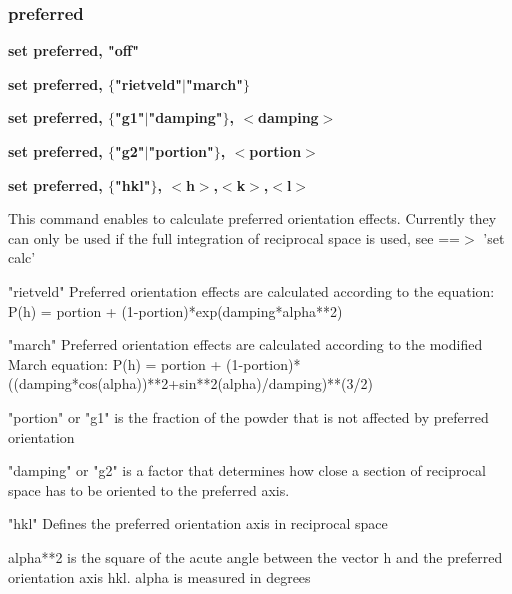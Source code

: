 \subsubsection{preferred}
{\bf set preferred, "off" \par }
{\bf set preferred, $ \{$"rietveld"$| $"march"$\} $ \par }
{\bf set preferred, $ \{$"g1"$| $"damping"$\} $, $ <$damping$> $ \par }
{\bf set preferred, $ \{$"g2"$| $"portion"$\} $, $ <$portion$> $ \par }
{\bf set preferred, $ \{$"hkl"$\} $, $ <$h$> $,$ <$k$> $,$ <$l$> $ \par }
\par
\vspace{3pt}
This command enables to calculate preferred orientation effects. 
Currently they can only be used if the full integration of reciprocal 
space is used, see ==$> $ 'set calc' 
\par
"rietveld" 
Preferred orientation effects are calculated according to the equation: 
P(h) = portion + (1-portion)*exp(damping*alpha**2) 
\par
"march" 
Preferred orientation effects are calculated according to the 
modified March equation: 
P(h) = portion + (1-portion)*((damping*cos(alpha))**2+sin**2(alpha)/damping)**(3/2) 
\par
"portion" or "g1" 
is the fraction of the powder that is not affected by preferred 
          orientation 
\par
"damping" or "g2" 
is a factor that determines how close a section of reciprocal 
          space has to be oriented to the preferred axis. 
\par
"hkl" 
Defines the preferred orientation axis in reciprocal space 
\par
\par
alpha**2  is the square of the acute angle between the vector h and the 
          preferred orientation axis hkl. alpha is measured in degrees 
